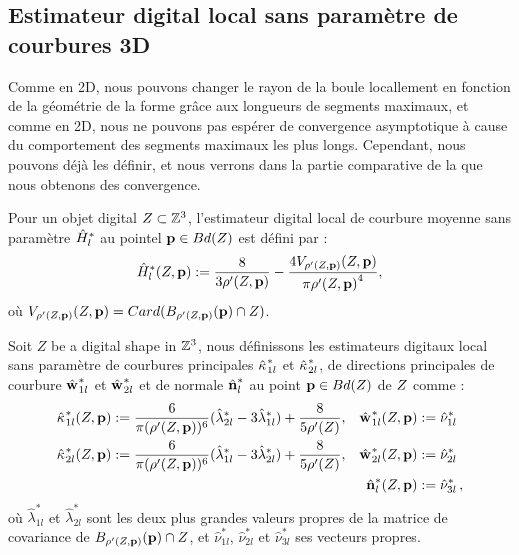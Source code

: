 \subsection{Estimateur digital local sans paramètre de courbures 3D}
%
Comme en 2D, nous pouvons changer le rayon de la boule locallement en fonction de la géométrie de la forme grâce aux longueurs de segments maximaux, et comme en 2D, nous ne pouvons pas espérer de convergence asymptotique à cause du comportement des segments maximaux les plus longs. Cependant, nous pouvons déjà les définir, et nous verrons dans la partie comparative de la  que nous obtenons des convergence.
%
\begin{definition}
  Pour un objet digital $Z \subset \mathbb{Z}^3$, l'estimateur digital local de
  courbure moyenne sans paramètre $\hat{H}^{*}_{l}$ au pointel $\mathbf{p} \in
  Bd({Z})$ est défini par :
  \begin{equation}
    \hat{H}^{*}_{l}( Z, \mathbf{p} ) := \frac{8}{3 {\rho'(Z, \mathbf{p})}} - \frac{4 V_{{\rho'(Z, \mathbf{p})}}(Z, \mathbf{p})}{\pi{{\rho'(\ensuremath{Z}, \ensuremath{\mathbf{p}})}}^4} ,
    \label{def:curvature-estimator-3d-mean-pfl}
  \end{equation}
  où $V_{\rho'(Z, \mathbf{p})}(Z, \mathbf{p}) = Card(B_{\rho'(Z, \mathbf{p})}(\mathbf{p}) \cap Z)$.
\end{definition}
%
\begin{definition}
  Soit $Z$ be a digital shape in $\mathbb{Z}^3$, nous définissons les estimateurs
  digitaux local sans paramètre de courbures principales $\hat{\kappa_{}}_{1l}^{*}$ et
  $\hat{\kappa_{}}_{2l}^{*}$, de directions principales de courbure $\hat{\mathbf{w}_{}}_{1l}^{*}$ et
  $\hat{\mathbf{w}_{}}_{2l}^{*}$ et de normale $\hat{\mathbf{n}{}}^{*}_{l}$ au point $\mathbf{p} \in
  Bd({Z})$ de $Z$ comme :
  \begin{align}
      \hat{\kappa_{}}_{1l}^{*}(Z, \mathbf{p})  &:= \frac{6}{\pi (\rho'(Z, \mathbf{p}))^6}(\hat{\lambda}^{*}_{2l} - 3\hat{\lambda}^{*}_{1l}) + \frac{8}{5 \rho'(Z)},
      &\hat{\mathbf{w}_{}}_{1l}^{*}(Z, \mathbf{p}) &:= \hat{\nu}^{*}_{1l} \\
      \hat{\kappa_{}}_{2l}^{*}(Z, \mathbf{p}) &:= \frac{6}{\pi (\rho'(Z, \mathbf{p}))^6}(\hat{\lambda}^{*}_{1l} - 3\hat{\lambda}^{*}_{2l}) + \frac{8}{5 \rho'(Z)},
      &\hat{\mathbf{w}_{}}_{2l}^{*}(Z, \mathbf{p}) &:= \hat{\nu}^{*}_{2l}\\
      & &\hat{\mathbf{n}{}}^{*}_{l}(Z, \mathbf{p}) &:=\hat{\nu}^{*}_{3l}\,,
  \end{align}
  où $\hat{\lambda}^{*}_{1l}$ et $\hat{\lambda}^{*}_{2l}$ sont les deux plus grandes
  valeurs propres de la matrice de covariance de $B_{{\rho'(Z, \mathbf{p})}}(\mathbf{p})
  \cap Z$, et $ \hat{\nu}^{*}_{1l}$, $\hat{\nu}^{*}_{2l}$ et $\hat{\nu}^{*}_{3l}$
  ses vecteurs propres.
  \label{def:curvature-estimator-3d-k1k2-pfl}
\end{definition}
%
